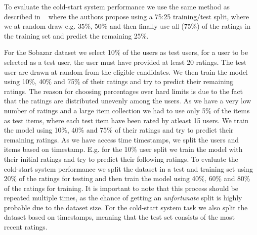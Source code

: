 To evaluate the cold-start system performance we use the same method as described
in ~\cite{Agarwal2009} where the authors propose using a 75:25 training/test split,
where we at random draw e.g. 35\%, 50\% and then finally use all (75\%) of the
ratings in the training set and predict the remaining 25\%.


For the Sobazar dataset we select 10\% of the users as test users, for a user to be
selected as a test user, the user must have provided at least 20 ratings. The test user are drawn
at random from the eligible candidates. We then train
the model using 10\%, 40\% and 75\% of their ratings and try to predict their remaining ratings.
The reason for choosing percentages over hard limits is due to the fact that the ratings are
distributed unevenly among the users. As we have a very low number of ratings and a large item collection we had to use
only 5\% of the items as test items, where each test item have been rated by atleast 15 users.
We train the model using 10\%, 40\% and 75\% of their ratings and try to predict their remaining
ratings. As we have access time timestamps, we split the users and items based on timestamp.
E.g. for the 10\% user split we train the model with their initial ratings and try to predict
their following ratings. To evaluate the cold-start system performance we split the dataset in a test
and training set using 20\% of the ratings for testing and then train the model
using 40\%, 60\% and 80\% of the ratings for training. It is important to note that
this process should be repeated multiple times, as the chance of getting an
\emph{unfortunate} split is highly probable due to the dataset size. For the cold-start
system task we also split the dataset based on timestamps, meaning that the test set consists
of the most recent ratings.





